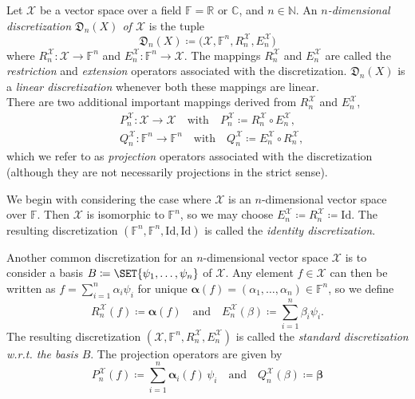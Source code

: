 \documentclass[a4paper]{paper}
\makeatletter
\newcommand*{\SPC}[1]{{\ensuremath{\mathscr{#1}}}}
\newcommand*{\SPCX}{\SPC{X}}
\newcommand{\FIELD}{{\ensuremath{\mathbb{F}}}}
\newcommand*{\Fn}{{\ensuremath{\FIELD^n}}}
\newcommand{\Real}{\mathbb{R}}
\newcommand{\Complex}{\mathbb{C}}
\newcommand{\Natural}{\mathbb{N}}
\newcommand*{\OP}[1]{{\ensuremath{\mathcal{#1}}}}
\newcommand*{\OPID}{\OP{\mathrm{Id}}}
\newcommand*{\EXT}[2]{\ensuremath{E_{#1}^{#2}}}
\newcommand*{\REST}[2]{\ensuremath{R_{#1}^{#2}}}
\newcommand*{\PROJ}[2]{\ensuremath{P_{#1}^{#2}}}
\newcommand*{\COPROJ}[2]{\ensuremath{Q_{#1}^{#2}}}
\newcommand*{\RnX}{{\ensuremath{\REST{n}{\SPC{X}}}}}
\newcommand*{\EnX}{{\ensuremath{\EXT{n}{\SPC{X}}}}}
\newcommand*{\PnX}{{\ensuremath{\PROJ{n}{\SPCX}}}}
\newcommand*{\QnX}{{\ensuremath{\COPROJ{n}{\SPCX}}}}
\newcommand*{\DISCR}[2]{{\ensuremath{\mathfrak{D}_{#2}(#1)}}}
\newcommand*{\DISCRnX}{\DISCR{X}{n}}
\newcommand{\wrt}{{w.r.t.}\@\xspace}
\newcommand{\valpha}{\boldsymbol{\alpha}}
\newcommand{\vbeta}{\boldsymbol{\beta}}
\makeatother
\begin{document}
\begin{definition}
 \label{def:discr:space:space_discr}
 Let $\SPCX$ be a vector space over a field $\FIELD = \Real \text{ or } \Complex$, and $n \in \Natural$.
 An \emph{$n$-dimensional discretization $\DISCRnX$ of $\SPCX$} is the tuple
 \begin{equation*}
  \DISCRnX \coloneqq  \bigl( \SPCX, \Fn, \RnX, \EnX \bigr) 
 \end{equation*}
 where $\RnX \colon \SPCX \to \Fn$ and $\EnX \colon \Fn \to \SPCX$. The mappings $\RnX$ and $\EnX$ 
 are called the \emph{restriction} and \emph{extension} operators associated with the discretization. 
 $\DISCRnX$ is a \emph{linear discretization} whenever both these mappings are linear.\\
 There are two additional important mappings derived from $\RnX$ and $\EnX$,
 \begin{align*}
  & \PnX \colon \SPCX \to \SPCX \quad \text{with} \quad \PnX \coloneqq  \RnX \circ \EnX, \\
  & \QnX \colon \Fn \to \Fn \quad \text{with} \quad \QnX \coloneqq  \EnX \circ \RnX,
 \end{align*}
 which we refer to as \emph{projection} operators associated with the discretization (although they are not 
necessarily  projections in the strict sense).
\end{definition}

\begin{examp}
 We begin with considering the case where $\SPCX$ is an $n$-dimensional vector space over $\FIELD$. Then $\SPCX$ is 
 isomorphic to $\Fn$, so we may choose $\EnX \coloneqq \RnX\coloneqq \OPID$. The resulting discretization 
 $( \Fn, \Fn, \OPID, \OPID )$ is called 
 the \emph{identity discretization}. 
\end{examp}

\begin{examp}
 Another common discretization for an $n$-dimensional vector space $\SPCX$ is to consider a basis 
 $B\coloneqq \SET{\psi_1,\dotsc, \psi_{n}}$ of $\SPCX$. Any element $f \in \SPCX$ can then be written as 
 $f = \sum_{i=1}^n \alpha_i \psi_i$ for unique $\valpha(f) = (\alpha_1, \dotsc, \alpha_{n})\in\Fn$, so we define
 \begin{equation*}
  \RnX(f) \coloneqq  \valpha(f) \quad \text{and} \quad \EnX(\beta) \coloneqq  \sum_{i=1}^n \beta_i \psi_i. 
 \end{equation*}
 The resulting discretization $( \SPCX, \Fn, \RnX, \EnX )$ is called the \emph{standard discretization \wrt 
 the basis $B$}. The projection operators are given by
 \begin{equation*}
  \PnX(f) \coloneqq  \sum_{i=1}^n \valpha_i(f)\, \psi_i \quad \text{and} \quad \QnX(\beta) \coloneqq  \vbeta
 \end{equation*}

\end{examp}
\end{document}

